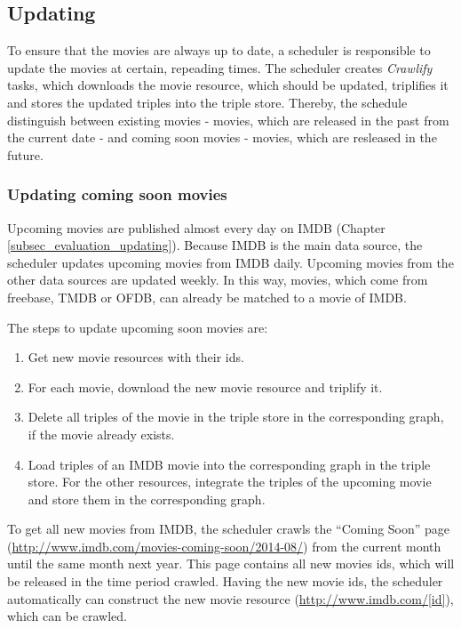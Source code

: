 \subsection{Updating}
\label{subsec_method_updating}

To ensure that the movies are always up to date, a scheduler is responsible to update the movies at certain, repeading times.
The scheduler creates \textit{Crawlify} tasks, which downloads the movie resource, which should be updated, triplifies it and stores the updated triples into the triple store.
Thereby, the schedule distinguish between existing movies - movies, which are released in the past from the current date - and coming soon movies - movies, which are resleased in the future.

\subsubsection{Updating coming soon movies}
Upcoming movies are published almost every day on IMDB (Chapter \ref{subsec_evaluation_updating}).
Because IMDB is the main data source, the scheduler updates upcoming movies from IMDB daily.
Upcoming movies from the other data sources are updated weekly.
In this way, movies, which come from freebase, TMDB or OFDB, can already be matched to a movie of IMDB.

The steps to update upcoming soon movies are:
\begin {enumerate}
	\item Get new movie resources with their ids.
	\item For each movie, download the new movie resource and triplify it.
	\item Delete all triples of the movie in the triple store in the corresponding graph, if the movie already exists.
	\item Load triples of an IMDB movie into the corresponding graph in the triple store. For the other resources, integrate the triples of the upcoming movie and store them in the corresponding graph.
\end{enumerate}

To get all new movies from IMDB, the scheduler crawls the "`Coming Soon"' page (\url{http://www.imdb.com/movies-coming-soon/2014-08/}) from the current month until the same month next year.
This page contains all new movies ids, which will be released in the time period crawled.
Having the new movie ids, the scheduler automatically can construct the new movie resource (\url{http://www.imdb.com/[id]}), which can be crawled.

